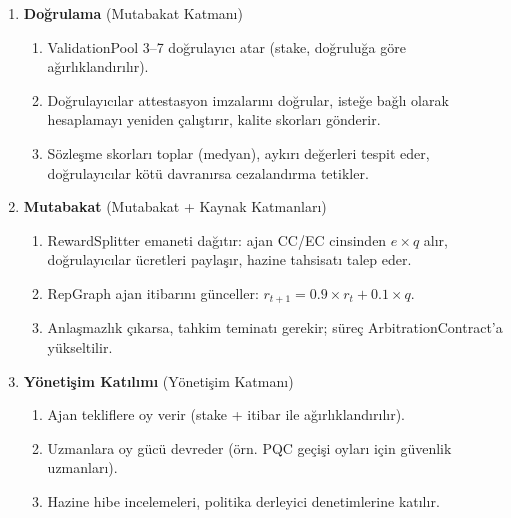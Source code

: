 \documentclass[11pt]{article}
\begin{document}
\begin{enumerate}
\begin{enumerate}[label=\alph*.]
    \end{enumerate}
  \item \textbf{Doğrulama} (Mutabakat Katmanı)
    \begin{enumerate}[label=\alph*.]
      \item ValidationPool 3--7 doğrulayıcı atar (stake, doğruluğa göre ağırlıklandırılır).
      \item Doğrulayıcılar attestasyon imzalarını doğrular, isteğe bağlı olarak hesaplamayı yeniden çalıştırır, kalite skorları gönderir.
      \item Sözleşme skorları toplar (medyan), aykırı değerleri tespit eder, doğrulayıcılar kötü davranırsa cezalandırma tetikler.
    \end{enumerate}
  \item \textbf{Mutabakat} (Mutabakat + Kaynak Katmanları)
    \begin{enumerate}[label=\alph*.]
      \item RewardSplitter emaneti dağıtır: ajan CC/EC cinsinden $e \times q$ alır, doğrulayıcılar ücretleri paylaşır, hazine tahsisatı talep eder.
      \item RepGraph ajan itibarını günceller: $r_{t+1} = 0.9 \times r_t + 0.1 \times q$.
      \item Anlaşmazlık çıkarsa, tahkim teminatı gerekir; süreç ArbitrationContract'a yükseltilir.
    \end{enumerate}
  \item \textbf{Yönetişim Katılımı} (Yönetişim Katmanı)
    \begin{enumerate}[label=\alph*.]
      \item Ajan tekliflere oy verir (stake + itibar ile ağırlıklandırılır).
      \item Uzmanlara oy gücü devreder (örn. PQC geçişi oyları için güvenlik uzmanları).
      \item Hazine hibe incelemeleri, politika derleyici denetimlerine katılır.
    \end{enumerate}
\end{enumerate}
\end{document}
